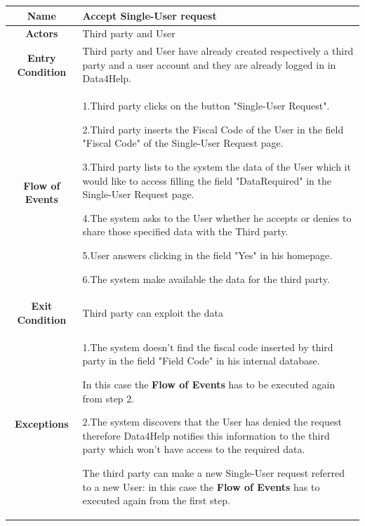       \begin{table}[h!]
        \centering
        \begin{tabularx}{\linewidth}{|c|X|}
          \hline

          \textbf{Name} & Accept Single-User request\\
        	\hline

        	\textbf{Actors} & Third party and User \\
        	\hline

        	\textbf{Entry Condition} & Third party and User have already created respectively a third party and a user account and they 							are already logged in in Data4Help.\\
        	\hline

        	\textbf{Flow of Events} & 1.Third party clicks on the button "Single-User Request".

        					2.Third party inserts the Fiscal Code of the User in the field "Fiscal Code" of the Single-User 								Request page.

        					3.Third party lists to the system the data of the User which it would like to access filling the field 							"DataRequired" in the Single-User Request page.

        					4.The system asks to the User whether he accepts or denies to share those specified data with the 					Third party.

        					5.User answers clicking in the field "Yes" in his homepage.

        					6.The system make available the data for the third party.\\
        	\hline

        	\textbf{Exit Condition} & Third party can exploit the data \\
        	\hline

        	\textbf{Exceptions} & 1.The system doesn't find the fiscal code inserted by third party in the field "Field Code" in his internal 				database.

        				In this case the \textbf{Flow of Events} has to be executed again from step 2.

        				2.The system discovers that the User has denied the request therefore Data4Help notifies this 							information to the third party which won't have access to the required data.

        				The third party can 	make a new Single-User request referred to a new User: in this case the 							\textbf{Flow of Events} has to executed again from the first step.\\

          \hline
        \end{tabularx}
      \end{table}


